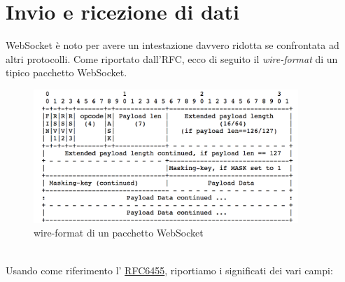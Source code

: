 \documentclass[
  oneside,
  11pt, a4paper,
  footinclude=true,
  headinclude=true,
  cleardoublepage=empty
]{scrbook}
\begin{document}
\section{Invio e ricezione di dati}
WebSocket è noto per avere un intestazione davvero ridotta se confrontata ad altri protocolli.
Come riportato dall'RFC, ecco di seguito il \textit{wire-format} di un tipico pacchetto WebSocket.
\begin{figure}[ht!]
    \centering
    \includegraphics[width=100mm]{wire_format.png}
    \caption{wire-format di un pacchetto WebSocket}
    \label{fig:wireformat}
\end{figure}
\\Usando come riferimento l' \href{https://tools.ietf.org/html/rfc6455#section-5.2}{RFC6455}, riportiamo i significati dei vari campi:
\end{document}
